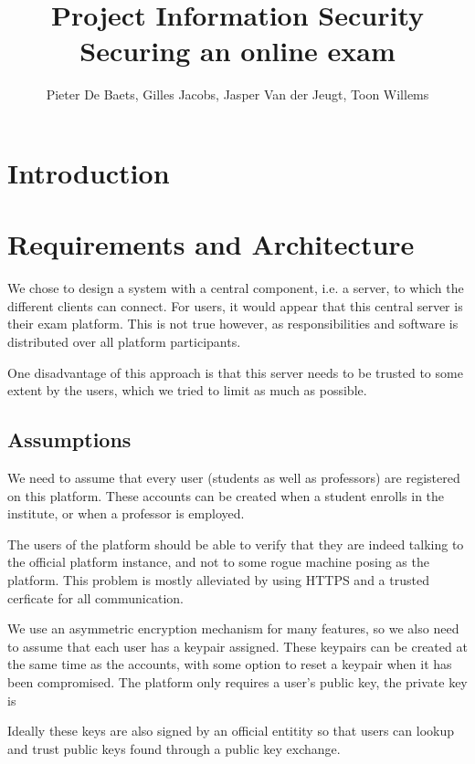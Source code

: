 \documentclass{article}
\title{Project Information Security \\ Securing an online exam}
\author{Pieter De Baets, Gilles Jacobs, Jasper Van der Jeugt, Toon Willems}
\begin{document}
\maketitle
\tableofcontents

\newpage

\section{Introduction}

\section{Requirements and Architecture}

We chose to design a system with a central component, i.e. a server, to which
the different clients can connect. For users, it would appear that this central
server is their exam platform. This is not true however, as responsibilities and
software is distributed over all platform participants.

One disadvantage of this approach is that this server needs to be trusted to
some extent by the users, which we tried to limit as much as possible.

\subsection{Assumptions}

We need to assume that every user (students as well as professors) are
registered on this platform. These accounts can be created when a student
enrolls in the institute, or when a professor is employed.

The users of the platform should be able to verify that they are indeed
talking to the official platform instance, and not to some rogue machine posing
as the platform. This problem is mostly alleviated by using HTTPS and a trusted
cerficate for all communication.


We use an asymmetric encryption mechanism for many features, so we also need to
assume that each user has a keypair assigned. These keypairs can be created at
the same time as the accounts, with some option to reset a keypair when it has
been compromised. The platform only requires a user's public key, the private
key is

Ideally these keys are also signed by an official entitity so
that users can lookup and trust public keys found through a public key exchange.
\end{document}

